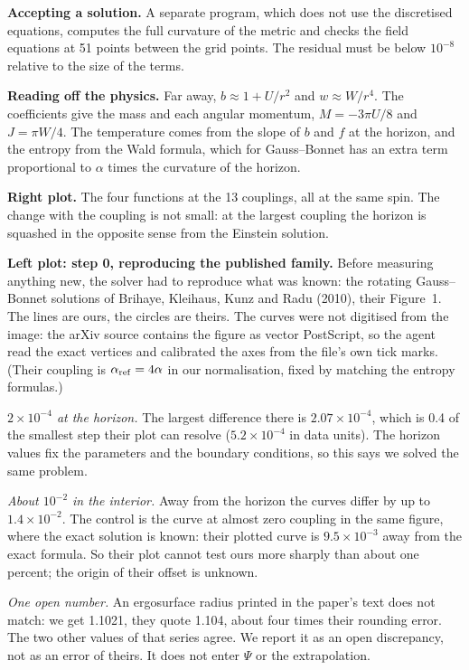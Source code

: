 \documentclass[12pt,a4paper]{article}
\begin{document}
\textbf{Accepting a solution.} A separate program, which does not use the
discretised equations, computes the full curvature of the metric and checks the
field equations at 51 points between the grid points. The residual must be below
$10^{-8}$ relative to the size of the terms.

\textbf{Reading off the physics.} Far away, $b \approx 1 + U/r^2$ and
$w \approx W/r^4$. The coefficients give the mass and each angular momentum,
$M = -3\pi U/8$ and $J = \pi W/4$. The temperature comes from the slope of $b$ and
$f$ at the horizon, and the entropy from the Wald formula, which for
Gauss--Bonnet has an extra term proportional to $\alpha$ times the curvature of
the horizon.

\textbf{Right plot.} The four functions at the 13 couplings, all at the same spin.
The change with the coupling is not small: at the largest coupling the horizon is
squashed in the opposite sense from the Einstein solution.

\textbf{Left plot: step 0, reproducing the published family.} Before measuring
anything new, the solver had to reproduce what was known: the rotating
Gauss--Bonnet solutions of Brihaye, Kleihaus, Kunz and Radu (2010), their
Figure~1. The lines are ours, the circles are theirs. The curves were not
digitised from the image: the arXiv source contains the figure as vector
PostScript, so the agent read the exact vertices and calibrated the axes from
the file's own tick marks. (Their coupling is $\alpha_{\rm ref} = 4\alpha$ in our
normalisation, fixed by matching the entropy formulas.)

\emph{$2\times10^{-4}$ at the horizon.} The largest difference there is
$2.07\times10^{-4}$, which is 0.4 of the smallest step their plot can resolve
($5.2\times10^{-4}$ in data units). The horizon values fix the parameters and the
boundary conditions, so this says we solved the same problem.

\emph{About $10^{-2}$ in the interior.} Away from the horizon the curves differ
by up to $1.4\times10^{-2}$. The control is the curve at almost zero coupling in
the same figure, where the exact solution is known: their plotted curve is
$9.5\times10^{-3}$ away from the exact formula. So their plot cannot test ours
more sharply than about one percent; the origin of their offset is unknown.

\emph{One open number.} An ergosurface radius printed in the paper's text does
not match: we get 1.1021, they quote 1.104, about four times their rounding
error. The two other values of that series agree. We report it as an open
discrepancy, not as an error of theirs. It does not enter $\Psi$ or the
extrapolation.
\end{document}

